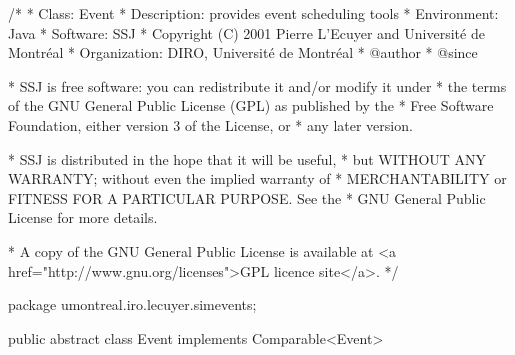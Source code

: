 \begin{code}
\begin{hide}
/*
 * Class:        Event
 * Description:  provides event scheduling tools
 * Environment:  Java
 * Software:     SSJ 
 * Copyright (C) 2001  Pierre L'Ecuyer and Université de Montréal
 * Organization: DIRO, Université de Montréal
 * @author       
 * @since

 * SSJ is free software: you can redistribute it and/or modify it under
 * the terms of the GNU General Public License (GPL) as published by the
 * Free Software Foundation, either version 3 of the License, or
 * any later version.

 * SSJ is distributed in the hope that it will be useful,
 * but WITHOUT ANY WARRANTY; without even the implied warranty of
 * MERCHANTABILITY or FITNESS FOR A PARTICULAR PURPOSE.  See the
 * GNU General Public License for more details.

 * A copy of the GNU General Public License is available at
   <a href="http://www.gnu.org/licenses">GPL licence site</a>.
 */
\end{hide}
package umontreal.iro.lecuyer.simevents;

public abstract class Event implements Comparable<Event>\begin{hide} {

   protected Simulator sim;
   //simulator linked with the current event

   protected double priority;
   //priority of the event. Priority is a second parameter (after eventTime)
   // used to class events for their running order, in the EventList.

   protected double eventTime;
   // Planned time of occurence of this event.  Negative if not planned.
   // Is protected because it is used (changed) in Process.

   // Replace that with instanceof simProcess to completely detach processes.
   // protected boolean isProcess = false;
   // Will be true for objects of the subclass Process of the class Event.
   // (i.e., true if this event is a process.)

   private int myra = 0;
   // A new event must always occur after those with same time and 
   // same priority in the Event list. myra is used for that in
   // SplayTree.java.

   // For internal use
   public final int getRa() { return myra; }
   public final void setRa(int r) { myra = r; }
\end{hide}
\end{code}


